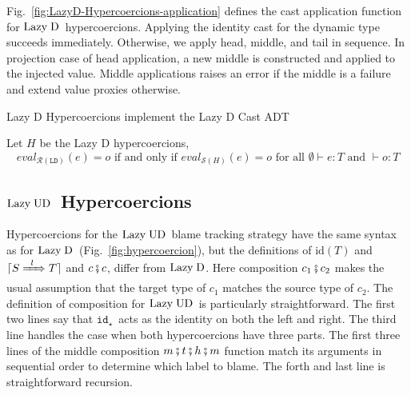 \documentclass[runningheads]{llncs}
\newcommand{\figref}[1]{Fig.~\ref{#1}}
\newcommand{\LUD}{\ensuremath{\text{Lazy\;UD}}}
\newcommand{\LD}{\ensuremath{\text{Lazy\;D}}}
\newcommand{\RMachine}[1]{\ensuremath{\mathcal{R}(#1)}}
\newcommand{\LDMachine}{\RMachine{\BLD}}
\newcommand{\SMachine}[1]{\ensuremath{\mathcal{S}(#1)}}
\newcommand{\Tdyn}[0]{\ensuremath{\star}}
\newcommand{\ccast}[3]{#1 \xRightarrow[]{\enskip #2 \enskip} #3}
\newcommand{\BLD}[0]{\ensuremath{\mathtt{LD}}}
\newcommand{\cnfid}[1]{\ensuremath{\mathtt{id}_{#1}}}
\newcommand{\hcci}[0]{\cnfid{\Tdyn}}
\newcommand{\compose}[2]{\ensuremath{#1 \fatsemi #2}}
\newcommand{\translate}[1]{\ensuremath{\lceil#1\rceil}}
\newcommand{\id}[1]{\ensuremath{\mathrm{id}(#1)}}
\newcommand{\expressiontyping}[3]{\ensuremath{#1 \vdash #2 : #3}}
\newcommand{\valuetyping}[2]{\ensuremath{\vdash #1 : #2}}
\newcommand{\withmachineevalto}[3]{\ensuremath{\mathit{eval}_{#1}(#2)=#3}}
\newcommand{\compatibletailhead}[2]{\ensuremath{#1\;\mathit{R}\;#2}}
\newcommand{\machineequiv}[2]{
	\ensuremath{
		\withmachineevalto{#1}{e}{o}	
		\text{ if and only if }
		\withmachineevalto{#2}{e}{o}
		\text{ for all }
		\expressiontyping{\emptyset}{e}{T}
		\text{ and }
		\valuetyping{o}{T}
	}}
\begin{document}
Fig.~\ref{fig:LazyD-Hypercoercions-application} defines the cast application 
function for \LD\ hypercoercions.
Applying the identity cast for the dynamic type succeeds immediately. 
Otherwise, we apply head, middle, and tail in sequence. 
%
In projection case of head application, a new middle is constructed and applied 
to the injected value.
%
Middle applications raises an error if the middle is a failure and extend value 
proxies otherwise.

\begin{proposition} Lazy D Hypercoercions implement the Lazy D Cast ADT
\end{proposition}
\begin{theorem} Let $H$ be the Lazy D 
hypercoercions,
\[\machineequiv{\LDMachine}{\SMachine{H}}\]
\end{theorem}


\subsection{\LUD\ Hypercoercions} \label{sec:LazyUD-Hypercoercions}

Hypercoercions for the \LUD\ blame tracking strategy have the same syntax
as for \LD\ (\figref{fig:hypercoercion}), but the definitions of $\id{T}$ and
$\translate{\ccast{S}{l}{T}}$ and $\compose{c}{c}$, differ from \LD. Here 
composition $\compose{c_1}{c_2}$ makes the usual assumption that the
target type of $c_1$ matches the source type of $c_2$. 
%
The definition of composition for \LUD\ is particularly straightforward.
The first two lines say that \hcci\ acts as the identity on both the left
and right.
The third line handles the case when both hypercoercions have three parts. 
%
The first three lines of the middle composition $m \fatsemi t \fatsemi h 
\fatsemi m$ function match its arguments in sequential order to determine which 
label to blame. The forth and last line is straightforward recursion.

\todo[inline]{KC: I need a better name for \compatibletailhead{t}{h}}

\end{document}
